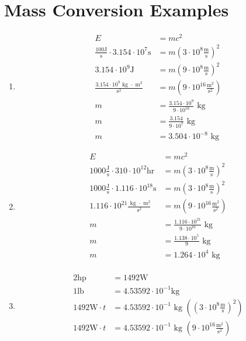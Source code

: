 \documentclass[11pt,letterpaper, twocolumn]{article}
\begin{document}
\section{Mass Conversion Examples}
\begin{enumerate}
    \item \begin{align*}
        E&=mc^2\\
        \frac{100 \text{J}}{\text{s}} \cdot 3.154\cdot 10^7 \text{s} &= m (3\cdot 10^8 \frac{\text{m}}{\text{s}})^2\\
        3.154\cdot 10^9 \text{J}  &= m (9\cdot 10^8 \frac{\text{m}}{\text{s}})^2\\
        \frac{3.154\cdot 10^9 \text{ kg $\cdot$ m$^2$}}{\text{s$^2$}}  &= m (9\cdot 10^{16} \frac{\text{m$^2$}}{\text{s$^2$}})\\
        m&= \frac{3.154\cdot 10^9}{9\cdot 10^{16}}\text{ kg}\\
        m&= \frac{3.154}{9\cdot 10^{7}}\text{ kg}\\
        m&= 3.504\cdot 10^{-8}\text{ kg}
    \end{align*}
    \item \begin{align*}
        E&=mc^2\\
        1000\frac{\text{J}}{\text{s}} \cdot 310 \cdot 10^{12}\text{hr} &= m (3\cdot 10^8 \frac{\text{m}}{\text{s}})^2\\
        1000\frac{\text{J}}{\text{s}} \cdot 1.116\cdot 10^{18}\text{s} &= m (3\cdot 10^8 \frac{\text{m}}{\text{s}})^2\\
        1.116\cdot 10^{21} \frac{\text{ kg $\cdot$ m$^2$}}{\text{s$^2$}} &= m (9\cdot 10^{16} \frac{\text{m$^2$}}{\text{s$^2$}})\\
        m &= \frac{1.116\cdot 10^{21}}{9\cdot 10^{16}}\text{ kg}\\
        m &= \frac{1.138 \cdot 10^{5}}{9}\text{ kg}\\
        m &= 1.264 \cdot 10^4\text{ kg}\\
    \end{align*}
    \item \begin{align*}
        2 \text{hp} &= 1492 \text{W}\\
        1 \text{lb} &= 4.53592 \cdot 10^{-1} \text{kg}\\
        1492 \text{W} \cdot t &= 4.53592 \cdot 10^{-1}\text{ kg } ((3\cdot 10^8 \frac{\text{m}}{\text{s}})^2)\\
        1492 \text{W} \cdot t &= 4.53592 \cdot 10^{-1}\text{ kg } (9\cdot 10^{16} \frac{\text{m$^2$}}{\text{s$^2$}})\\

\end{align*}
\end{enumerate}
\end{document}
